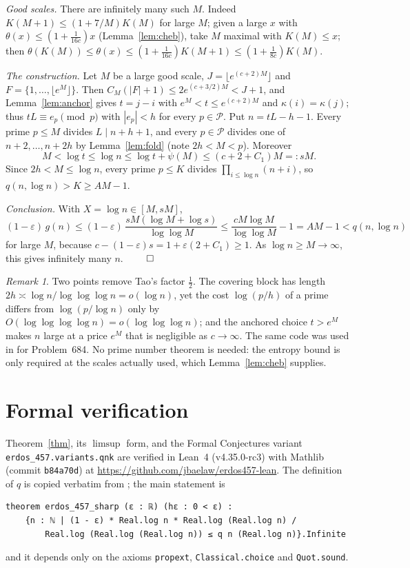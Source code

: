 \documentclass[11pt]{article}
\theoremstyle{remark}
\newtheorem*{remark}{Remark}
\begin{document}
\emph{Good scales.}  There are infinitely many such \(M\).  Indeed
\(K(M+1)\le(1+7/M)K(M)\) for large \(M\); given a large \(x\) with
\(\theta(x)\le(1+\frac1{16c})x\) (Lemma~\ref{lem:cheb}), take \(M\) maximal with \(K(M)\le x\);
then \(\theta(K(M))\le\theta(x)\le(1+\frac1{16c})K(M+1)\le(1+\frac1{8c})K(M)\).

\emph{The construction.}  Let \(M\) be a large good scale, \(J=\lfloor e^{(c+2)M}\rfloor\) and
\(F=\{1,\dots,\lfloor e^M\rfloor\}\).  Then \(C_M(|F|+1)\le2e^{(c+3/2)M}<J+1\), and
Lemma~\ref{lem:anchor} gives \(t=j-i\) with \(e^M<t\le e^{(c+2)M}\) and \(\kappa(i)=\kappa(j)\);
thus \(tL\equiv e_p\pmod p\) with \(|e_p|<h\) for every \(p\in\mathcal P\).  Put \(n=tL-h-1\).
Every prime \(p\le M\) divides \(L\mid n+h+1\), and every \(p\in\mathcal P\) divides one of
\(n+2,\dots,n+2h\) by Lemma~\ref{lem:fold} (note \(2h<M<p\)).  Moreover
\[
M<\log t\le\log n\le\log t+\psi(M)\le(c+2+C_1)M=:sM .
\]
Since \(2h<M\le\log n\), every prime \(p\le K\) divides \(\prod_{i\le\log n}(n+i)\), so
\(q(n,\log n)>K\ge AM-1\).

\emph{Conclusion.}  With \(X=\log n\in[M,sM]\),
\[
(1-\varepsilon)\,g(n)\le(1-\varepsilon)\,\frac{sM(\log M+\log s)}{\log\log M}
\le\frac{cM\log M}{\log\log M}-1=AM-1<q(n,\log n)
\]
for large \(M\), because \(c-(1-\varepsilon)s=1+\varepsilon(2+C_1)\ge1\).  As
\(\log n\ge M\to\infty\), this gives infinitely many \(n\). \(\qed\)

\begin{remark}
Two points remove Tao's factor \(\tfrac12\).  The covering block has length
\(2h\asymp\log n/\log\log\log n=o(\log n)\), yet the cost \(\log(p/h)\) of a prime differs from
\(\log(p/\log n)\) only by \(O(\log\log\log\log n)=o(\log\log\log n)\); and the anchored choice
\(t>e^M\) makes \(n\) large at a price \(e^{M}\) that is negligible as \(c\to\infty\).  The same
code was used in \cite{Bae684} for Problem~684.  No prime number theorem is needed: the entropy
bound is only required at the scales actually used, which Lemma~\ref{lem:cheb} supplies.
\end{remark}

\section{Formal verification}

Theorem~\ref{thm}, its \(\limsup\) form, and the Formal Conjectures variant
\texttt{erdos\_457.variants.qnk} are verified in Lean~4 (v4.35.0-rc3) with Mathlib
\cite{Mathlib} (commit \texttt{b84a70d}) at
\url{https://github.com/jbaelaw/erdos457-lean}.  The definition of \(q\) is copied verbatim from
\cite{FC}; the main statement is
\begin{lstlisting}
theorem erdos_457_sharp (ε : ℝ) (hε : 0 < ε) :
    {n : ℕ | (1 - ε) * Real.log n * Real.log (Real.log n) /
        Real.log (Real.log (Real.log n)) ≤ q n (Real.log n)}.Infinite
\end{lstlisting}
and it depends only on the axioms \texttt{propext}, \texttt{Classical.choice} and
\texttt{Quot.sound}.
\end{document}
